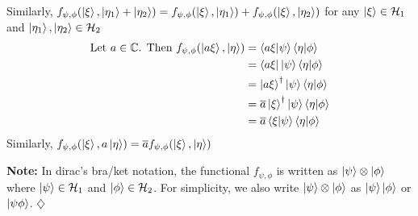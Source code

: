 \documentclass[12pt,twoside,fleqn]{report}
\makeatletter
\theoremstyle{thmstyle}
\renewenvironment{proof}[1][\proofname]{\par
\pushQED{\qed}%
\normalfont \topsep6\p@\@plus6\p@\relax
\trivlist
\item[\hskip\labelsep\itshape#1\@addpunct{.}]\mbox{}\par\nobreak\ignorespaces
}{%
    \popQED\endtrivlist\@endpefalse
    }
\newenvironment{note}{\textbf{Note:}}{\hfill\ensuremath{\diamondsuit}}
\makeatother
\begin{document}
\begin{proof}
    Similarly, $f_{\psi,\phi}(\ket\xi, \ket{\eta_1} + \ket{\eta_2}) = f_{\psi,\phi}(\ket\xi, \ket{\eta_1}) + f_{\psi,\phi}(\ket\xi , \ket{\eta_2})$
    for any $\ket\xi \in \mathcal{H}_1$ and $\ket{\eta_1}, \ket{\eta_2}  \in \mathcal{H}_2$
    \begin{align*}
    \text{Let } a \in \mathbb{C}\text{. Then }f_{\psi,\phi}(\ket{a \xi},\ket{\eta}) & = \braket{a \xi|\psi}\braket{\eta|\phi}
        \\ & = \bra{a \xi}\ket{\psi}\braket{\eta|\phi}
        \\ & = \ket{a \xi}^\dagger \ket{\psi} \braket{\eta|\phi}
        \\ & = \overline{a} \ket{\xi}^\dagger \ket{\psi} \braket{\eta|\phi}
        \\ & = \overline{a} \braket{\xi|\psi} \braket{\eta|\phi}
    \end{align*}
    Similarly, $f_{\psi,\phi}(\ket\xi, a \ket\eta) = \overline{a}f_{\psi,\phi}(\ket\xi, \ket\eta)$
\end{proof}

\begin{note}
    In dirac's bra/ket notation, the functional $f_{\psi,\phi}$ is written as $\ket{\psi} \otimes \ket{\phi}$ where $\ket{\psi} \in \mathcal{H}_1$ and $\ket{\phi} \in \mathcal{H}_2$.
    For simplicity, we also write $\ket{\psi} \otimes \ket{\phi}$ as $\ket{\psi}\ket{\phi}$ or $\ket{\psi\phi}$.
\end{note}
\end{document}
